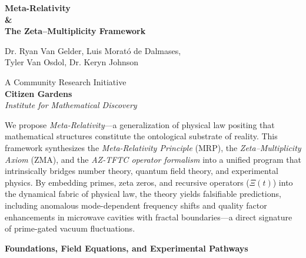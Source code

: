 \documentclass[12]{amsart}
\theoremstyle{plain}
\begin{document}
\begin{titlepage}
    \centering
 

\vspace*{1em}
  \Huge\textbf{Meta-Relativity\\ \& \\The Zeta–Multiplicity Framework}
    \vspace{2cm} \\
     \LARGE{Dr. Ryan Van Gelder, Luis Morató de Dalmases, \\ Tyler Van Osdol, Dr. Keryn Johnson\par}
   \vspace{2cm}
     \Large{A Community Research Initiative}
  \vspace{1cm} \\
     {\bfseries Citizen Gardens}\\
     \vspace{1cm}
    \textit{Institute for Mathematical Discovery}\\
     \vspace{1cm}
    \textt{\today \par}
    \vfill

   
    \vspace{0.5em}
    \begin{minipage}{0.85\textwidth}
        \small
We propose \emph{Meta-Relativity}---a generalization of physical law positing that mathematical structures constitute the ontological substrate of reality. This framework synthesizes the \emph{Meta-Relativity Principle} (MRP), the \emph{Zeta--Multiplicity Axiom} (ZMA), and the \emph{AZ-TFTC operator formalism} into a unified program that intrinsically bridges number theory, quantum field theory, and experimental physics. By embedding primes, zeta zeros, and recursive operators ($\Xi(t)$) into the dynamical fabric of physical law, the theory yields falsifiable predictions, including anomalous mode-dependent frequency shifts and quality factor enhancements in microwave cavities with fractal boundaries---a direct signature of prime-gated vacuum fluctuations.


    \end{minipage}

\end{titlepage}


\clearpage
\clearpage
\thispagestyle{empty}
\begin{center}
    \Large\textbf{Foundations, Field Equations, and Experimental Pathways }
\end{center}
\end{document}
